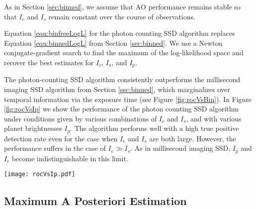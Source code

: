 \documentclass[../main.tex]{subfiles}
\begin{document}
As in Section \ref{sec:binned}, we assume that AO performance remains stable so that $I_c$ and $I_s$ remain constant over the course of observations. 

Equation \eqref{equ:binfreeLogL} for the photon counting SSD algorithm replaces Equation \eqref{equ:binnedLogL} from Section \ref{sec:binned}. We use a Newton conjugate-gradient search to find the maximum of the log-likelihood space and recover the best estimates for $I_c$, $I_s$, and $I_p$. 

The photon-counting SSD algorithm consistently outperforms the millisecond imaging SSD algorithm from Section \ref{sec:binned}, which marginalizes over temporal information via the exposure time (see Figure \ref{fig:rocVsBin}). In Figure \ref{fig:rocVsIp} we show the performance of the photon counting SSD algorithm under conditions given by various combinations of $I_c$ and $I_s$, and with various planet brightnesses $I_p$. The algorithm performs well with a high true positive detection rate even for the case when $I_c$ and $I_s$ are both large. However, the performance suffers in the case of $I_c \gg I_s$. As in millisecond imaging SSD, $I_p$ and $I_c$ become indistinguishable in this limit. 

\begin{figure*}
    \centering
    \texttt{[image: rocVsIp.pdf]}
    \caption[ROC curve performance of the photon-counting SSD algorithm]{Performance of our photon-counting SSD algorithm. Left panels: histograms of the maximum likelihood estimates of $I_p$, computed using $3\cdot 10^5$ 30~s mock photon lists for each set of parameters. The $\pm\sigma$ for the long exposure photon noise limit (Equation \eqref{eq:totalnoise}) is shown with an error bar. The $y$-axis in the left column is arbitrary. The probability distributions are used to calculate the true/false positive rates for the receiver operator characteristic (ROC) curve (right panels). The vertical dotted line at 1/20000 (for the 20000 pixels in MEC) roughly indicates the maximum tolerable false positive rate. The algorithm performs well with a high true positive detection rate even for the case when $I_c$, $I_s$ are both large. However, the performance suffers in the case of $I_c \gg I_s$ (row 2). }
    \label{fig:rocVsIp}
\end{figure*}

\subsection{Maximum A Posteriori Estimation}
\end{document}
